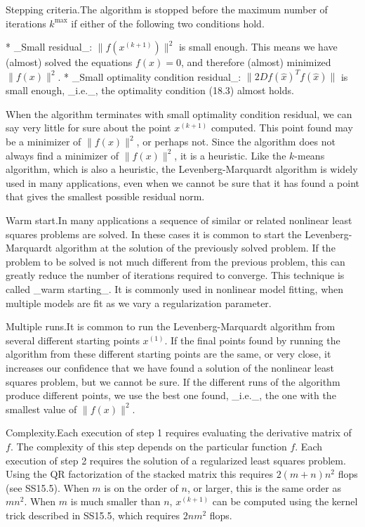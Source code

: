 Stepping criteria.The algorithm is stopped before the maximum number of iterations \(k^{\max}\) if either of the following two conditions hold.

* _Small residual_: \(\|f(x^{(k+1)})\|^{2}\) is small enough. This means we have (almost) solved the equations \(f(x)=0\), and therefore (almost) minimized \(\|f(x)\|^{2}\).
* _Small optimality condition residual_: \(\|2Df(\hat{x})^{T}f(\hat{x})\|\) is small enough, _i.e._, the optimality condition (18.3) almost holds.

When the algorithm terminates with small optimality condition residual, we can say very little for sure about the point \(x^{(k+1)}\) computed. This point found may be a minimizer of \(\|f(x)\|^{2}\), or perhaps not. Since the algorithm does not always find a minimizer of \(\|f(x)\|^{2}\), it is a heuristic. Like the \(k\)-means algorithm, which is also a heuristic, the Levenberg-Marquardt algorithm is widely used in many applications, even when we cannot be sure that it has found a point that gives the smallest possible residual norm.

Warm start.In many applications a sequence of similar or related nonlinear least squares problems are solved. In these cases it is common to start the Levenberg-Marquardt algorithm at the solution of the previously solved problem. If the problem to be solved is not much different from the previous problem, this can greatly reduce the number of iterations required to converge. This technique is called _warm starting_. It is commonly used in nonlinear model fitting, when multiple models are fit as we vary a regularization parameter.

Multiple runs.It is common to run the Levenberg-Marquardt algorithm from several different starting points \(x^{(1)}\). If the final points found by running the algorithm from these different starting points are the same, or very close, it increases our confidence that we have found a solution of the nonlinear least squares problem, but we cannot be sure. If the different runs of the algorithm produce different points, we use the best one found, _i.e._, the one with the smallest value of \(\|f(x)\|^{2}\).

Complexity.Each execution of step 1 requires evaluating the derivative matrix of \(f\). The complexity of this step depends on the particular function \(f\). Each execution of step 2 requires the solution of a regularized least squares problem. Using the QR factorization of the stacked matrix this requires \(2(m+n)n^{2}\) flops (see SS15.5). When \(m\) is on the order of \(n\), or larger, this is the same order as \(mn^{2}\). When \(m\) is much smaller than \(n\), \(x^{(k+1)}\) can be computed using the kernel trick described in SS15.5, which requires \(2nm^{2}\) flops.

